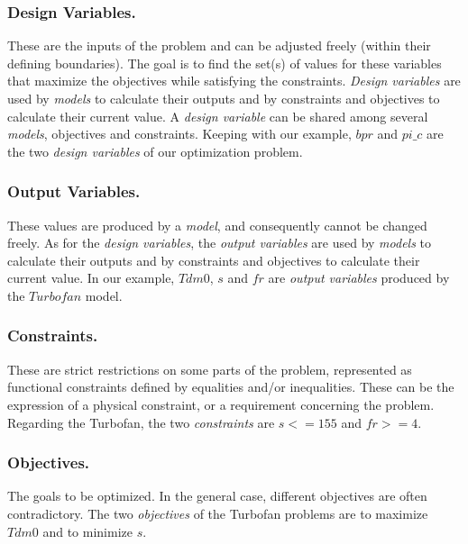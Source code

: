 \subsubsection*{Design Variables.}

These are the inputs of the problem and can be adjusted freely (within their defining boundaries). The goal is to find the set(s) of values for these variables that maximize the objectives while satisfying the constraints.
\emph{Design variables} are used by \emph{models} to calculate their outputs and by constraints and objectives to calculate their current value. A \emph{design variable} can be shared among several \emph{models}, objectives and constraints.
Keeping with our example, $bpr$ and $pi\_c$ are the two \emph{design variables} of our optimization problem.

\subsubsection*{Output Variables.}

These values are produced by a \emph{model}, and consequently cannot be changed freely.
As for the \emph{design variables}, the \emph{output variables} are used by \emph{models} to calculate their outputs and by constraints and objectives to calculate their current value.
In our example, $Tdm0$, $s$ and $fr$ are \emph{output variables} produced by the $Turbofan$ model.

\subsubsection*{Constraints.}

These are strict restrictions on some parts of the problem, represented as functional constraints defined by equalities and/or inequalities. These can be the expression of a physical constraint, or a requirement concerning the problem.
Regarding the Turbofan, the two \emph{constraints} are $s <= 155$ and $fr >=4$.

\subsubsection*{Objectives.}

The goals to be optimized. In the general case, different objectives are often contradictory.
The two  \emph{objectives} of the Turbofan problems are to maximize $Tdm0$ and to minimize $s$.


